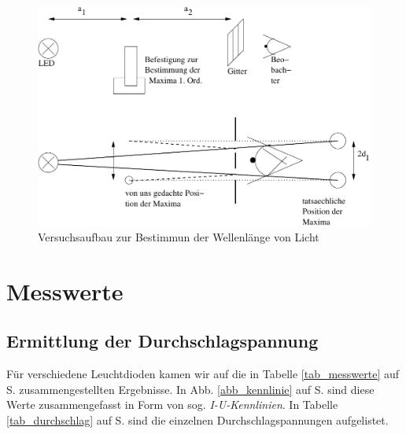 \begin{figure}
   \centering
   \includegraphics[width=\textwidth]{praktika/mat_praktika/aufbau_12}
   \caption{Versuchsaufbau zur Bestimmun der Wellenlänge von Licht}
   \label{abb_wellenlaenge}
\end{figure}






\section{Messwerte}


\subsection{Ermittlung der Durchschlagspannung}

Für verschiedene Leuchtdioden kamen wir auf die in Tabelle \ref{tab_messwerte} auf S. \pageref{tab_messwerte}zusammengestellten Ergebnisse. In Abb. \ref{abb_kennlinie} auf S. \pageref{abb_kennlinie} sind diese Werte zusammengefasst in Form von sog. \emph{I-U-Kennlinien}. In Tabelle \ref{tab_durchschlag} auf S. \pageref{tab_durchschlag} sind die einzelnen Durchschlagspannungen aufgelistet. %


